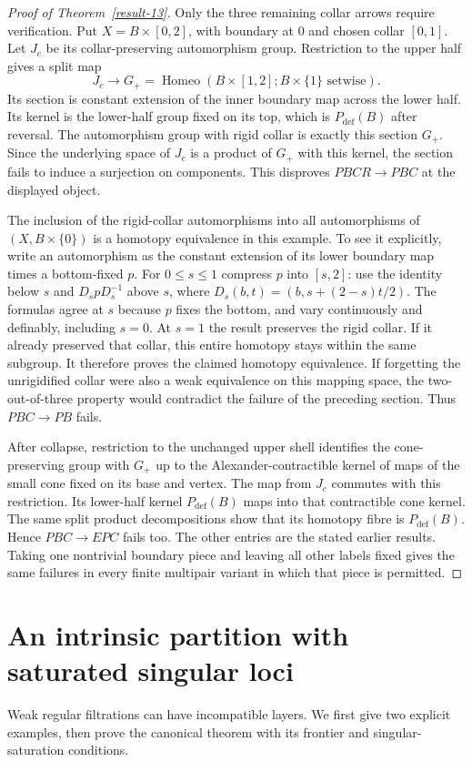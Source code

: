 \documentclass[11pt,a4paper]{article}
\theoremstyle{definition}
\DeclareMathOperator{\Homeo}{Homeo}
\begin{document}
\begin{proof}[Proof of Theorem~\ref{result-13}]
Only the three remaining collar arrows require verification. Put
$X=B\times[0,2]$, with boundary at $0$ and chosen collar $[0,1]$.
Let $J_c$ be its collar-preserving automorphism group. Restriction to
the upper half gives a split map
\[
 J_c\longrightarrow G_+=\Homeo(B\times[1,2];B\times\{1\}
 \text{ setwise}).
\]
Its section is constant extension of the inner boundary map across
the lower half. Its kernel is the lower-half group fixed on its top,
which is $P_{\mathrm{def}}(B)$ after reversal. The automorphism group
with rigid collar is exactly this section $G_+$. Since the underlying
space of $J_c$ is a product of $G_+$ with this kernel, the section
fails to induce a surjection on components. This disproves
$PBCR\to PBC$ at the displayed object.

The inclusion of the rigid-collar automorphisms into all automorphisms
of $(X,B\times\{0\})$ is a homotopy equivalence in this example.
To see it explicitly, write an automorphism as the constant extension
of its lower boundary map times a bottom-fixed $p$. For $0\le s\le1$
compress $p$ into $[s,2]$: use the identity below $s$ and
$D_s pD_s^{-1}$ above $s$, where
$D_s(b,t)=(b,s+(2-s)t/2)$. The formulas agree at $s$ because $p$
fixes the bottom, and vary continuously and definably, including
$s=0$. At $s=1$ the result preserves the rigid collar. If it already
preserved that collar, this entire homotopy stays within the same
subgroup. It therefore proves the claimed homotopy equivalence.
If forgetting the unrigidified collar were also a weak equivalence
on this mapping space, the two-out-of-three property would contradict
the failure of the preceding section. Thus $PBC\to PB$ fails.

After collapse, restriction to the unchanged upper shell identifies
the cone-preserving group with $G_+$ up to the Alexander-contractible
kernel of maps of the small cone fixed on its base and vertex.
The map from $J_c$ commutes with this restriction. Its lower-half
kernel $P_{\mathrm{def}}(B)$ maps into that contractible cone kernel.
The same split product decompositions show that its homotopy fibre
is $P_{\mathrm{def}}(B)$. Hence $PBC\to EPC$ fails too. The other
entries are the stated earlier results. Taking one nontrivial boundary
piece and leaving all other labels fixed gives the same failures in
every finite multipair variant in which that piece is permitted.
\end{proof}

\section{An intrinsic partition with saturated singular loci}
Weak regular filtrations can have incompatible layers. We first give
two explicit examples, then prove the canonical theorem with its
frontier and singular-saturation conditions.
\end{document}

